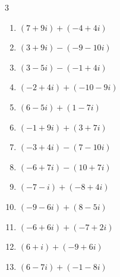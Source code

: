 \begin{multicols}{3}
\begin{enumerate}
  \item $\displaystyle (7+9i) + (-4+4i)$

        \phantom{$\displaystyle =3+13i$}

  \item $\displaystyle (3+9i) - (-9-10i)$

        \phantom{$\displaystyle =12+19i$}

  \item $\displaystyle (3-5i) - (-1+4i)$

        \phantom{$\displaystyle =4-9i$}

  \item $\displaystyle (-2+4i) + (-10-9i)$

        \phantom{$\displaystyle =-12-5i$}

  \item $\displaystyle (6-5i) + (1-7i)$

        \phantom{$\displaystyle =7-12i$}

  \item $\displaystyle (-1+9i) + (3+7i)$

        \phantom{$\displaystyle =2+16i$}

  \item $\displaystyle (-3+4i) - (7-10i)$

        \phantom{$\displaystyle =-10+14i$}

  \item $\displaystyle (-6+7i) - (10+7i)$

        \phantom{$\displaystyle =-16$}

  \item $\displaystyle (-7-i) + (-8+4i)$

        \phantom{$\displaystyle =-15+3i$}

  \item $\displaystyle (-9-6i) + (8-5i)$

        \phantom{$\displaystyle =-1-11i$}

  \item $\displaystyle (-6+6i) + (-7+2i)$

        \phantom{$\displaystyle =-13+8i$}

\columnbreak %

  \item $\displaystyle (6+i) + (-9+6i)$

        \phantom{$\displaystyle =-3+7i$}

  \item $\displaystyle (6-7i) + (-1-8i)$


\end{enumerate}
\end{multicols}
